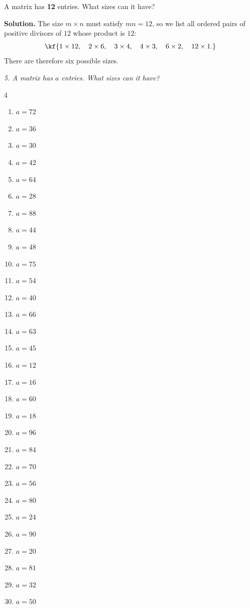 \begin{misol}
A matrix has \textbf{12} entries. What sizes can it have?

\textbf{Solution.} The size $m\times n$ must satisfy $m n = 12$, so we list all
ordered pairs of positive divisors of $12$ whose product is $12$:
\[\kf{1\times 12,\quad 2\times 6,\quad 3\times 4,\quad 4\times 3,\quad 6\times 2,\quad 12\times 1.}\]
There are therefore six possible sizes.
\end{misol}
\emph{5. A matrix has $a$ entries. What sizes can it have?}
\bigskip
\begin{multicols}{4}\raggedright
\small
\begin{enumerate}[label=\arabic*.,  leftmargin=*]
\item $a=72$
\item $a=36$
\item $a=30$
\item $a=42$
\item $a=64$
\item $a=28$
\item $a=88$
\item $a=44$
\item $a=48$
\item $a=75$
\item $a=54$
\item $a=40$
\item $a=66$
\item $a=63$
\item $a=45$
\item $a=12$
\item $a=16$
\item $a=60$
\item $a=18$
\item $a=96$
\item $a=84$
\item $a=70$
\item $a=56$
\item $a=80$
\item $a=24$
\item $a=90$
\item $a=20$
\item $a=81$
\item $a=32$
\item $a=50$
\end{enumerate}
\end{multicols}

